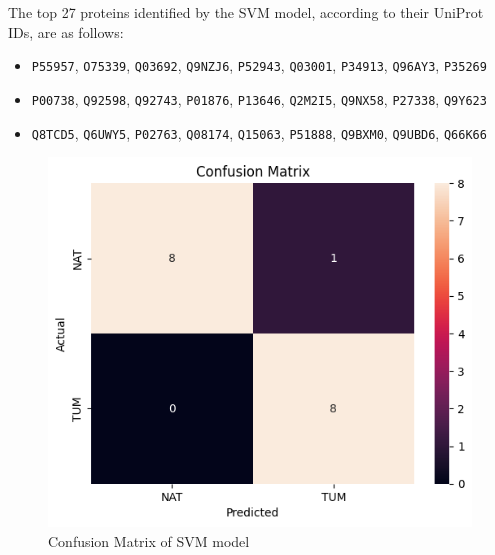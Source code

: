 \documentclass[a4paper,12pt]{article}
\begin{document}
The top 27 proteins identified by the SVM model, according to their UniProt IDs, are as follows:
\begin{itemize}
	\item \texttt{P55957}, \texttt{O75339}, \texttt{Q03692}, \texttt{Q9NZJ6}, \texttt{P52943}, \texttt{Q03001}, \texttt{P34913}, \texttt{Q96AY3}, \texttt{P35269}
	\item \texttt{P00738}, \texttt{Q92598}, \texttt{Q92743}, \texttt{P01876}, \texttt{P13646}, \texttt{Q2M2I5}, \texttt{Q9NX58}, \texttt{P27338}, \texttt{Q9Y623}
	\item \texttt{Q8TCD5}, \texttt{Q6UWY5}, \texttt{P02763}, \texttt{Q08174}, \texttt{Q15063}, \texttt{P51888}, \texttt{Q9BXM0}, \texttt{Q9UBD6}, \texttt{Q66K66}
\end{itemize}
\begin{figure}[H]
	\centering
	\begin{minipage}[b]{0.45\textwidth}
		\centering
		\includegraphics[width=\textwidth]{images/slc.png}
		\caption{Confusion Matrix of SVM model}
		\label{fig:confusion_matrix_svm}
	\end{minipage}
	\hfill
	\begin{minipage}[b]{0.45\textwidth}
		\centering

\end{minipage}
\end{figure}
\end{document}

